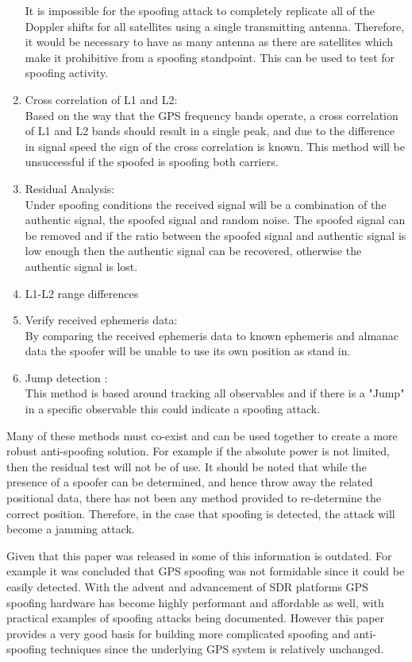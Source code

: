 \begin{enumerate}
    It is impossible for the spoofing attack to completely replicate all of the Doppler shifts for all satellites using a single transmitting antenna.
    Therefore, it would be necessary to have as many antenna as there are satellites which make it prohibitive from a spoofing standpoint. This can be
    used to test for spoofing activity.
    \item Cross correlation of L1 and L2: \\
    Based on the way that the GPS frequency bands operate, a cross correlation of L1 and L2 bands should result in a single peak, and due to the 
    difference in signal speed the sign of the cross correlation is known. This method will be unsuccessful if the spoofed is spoofing both carriers.
    \item Residual Analysis: \\
    Under spoofing conditions the received signal will be a combination of the authentic signal, the spoofed signal and random noise. The spoofed signal
    can be removed and if the ratio between the spoofed signal and authentic signal is low enough then the authentic signal can be recovered, otherwise
    the authentic signal is lost. 
    \item L1-L2 range differences
    \item Verify received ephemeris data: \\
    By comparing the received ephemeris data to known ephemeris and almanac data the spoofer will be unable to use its own position as stand in. 
    \item Jump detection : \\
    This method is based around tracking all observables and if there is a "Jump" in a specific observable this could indicate a spoofing attack.
\end{enumerate} 
Many of these methods must co-exist and can be used together to create a more robust anti-spoofing solution. For example if the absolute power is 
not limited, then the residual test will not be of use. It should be noted that while the presence of a spoofer can be determined, and hence 
throw away the related positional data, there has not been any method provided to re-determine the correct position. Therefore, in the case that
spoofing is detected, the attack will become a jamming attack.

Given that this paper was released in \citeyear{RN11} some of this information is outdated. For example it was concluded that GPS spoofing was not formidable
since it could be easily detected. With the advent and advancement of SDR platforms
GPS spoofing hardware has become highly performant and affordable as well, with practical examples of spoofing attacks being  documented. 
However this paper provides a very good basis for building more complicated spoofing and anti-spoofing techniques since the underlying GPS system is
relatively unchanged. 

